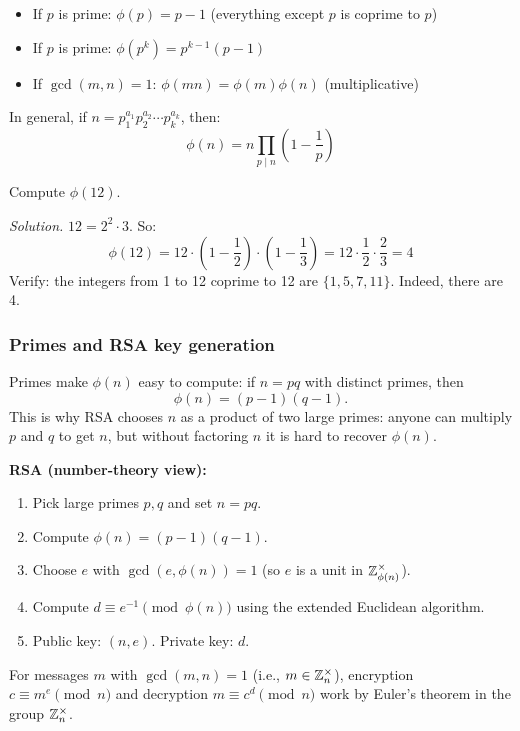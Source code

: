 \begin{theorem}
\begin{itemize}
  \item If $p$ is prime: $\phi(p) = p - 1$ (everything except $p$ is coprime to $p$)
  \item If $p$ is prime: $\phi(p^k) = p^{k-1}(p - 1)$
  \item If $\gcd(m, n) = 1$: $\phi(mn) = \phi(m)\phi(n)$ (multiplicative)
\end{itemize}
In general, if $n = p_1^{a_1} p_2^{a_2} \cdots p_k^{a_k}$, then:
\[
\phi(n) = n \prod_{p \mid n} \left(1 - \frac{1}{p}\right)
\]
\end{theorem}

\begin{example}
Compute $\phi(12)$.

\emph{Solution.} $12 = 2^2 \cdot 3$. So:
\[
\phi(12) = 12 \cdot \left(1 - \frac{1}{2}\right) \cdot \left(1 - \frac{1}{3}\right) = 12 \cdot \frac{1}{2} \cdot \frac{2}{3} = 4
\]
Verify: the integers from 1 to 12 coprime to 12 are $\{1, 5, 7, 11\}$. Indeed, there are 4.
\end{example}

\subsubsection*{Primes and RSA key generation}

Primes make $\phi(n)$ easy to compute: if $n = pq$ with distinct primes, then
\[
\phi(n) = (p-1)(q-1).
\]
This is why RSA chooses $n$ as a product of two large primes: anyone can multiply $p$ and $q$ to get $n$, but without factoring $n$ it is hard to recover $\phi(n)$.

\textbf{RSA (number-theory view):}
\begin{enumerate}
  \item Pick large primes $p, q$ and set $n = pq$.
  \item Compute $\phi(n) = (p-1)(q-1)$.
  \item Choose $e$ with $\gcd(e,\phi(n)) = 1$ (so $e$ is a unit in $\mathbb{Z}_{\phi(n)}^\times$).
  \item Compute $d \equiv e^{-1} \pmod{\phi(n)}$ using the extended Euclidean algorithm.
  \item Public key: $(n, e)$. Private key: $d$.
\end{enumerate}

For messages $m$ with $\gcd(m,n)=1$ (i.e., $m \in \mathbb{Z}_n^\times$), encryption $c \equiv m^e \pmod{n}$ and decryption $m \equiv c^d \pmod{n}$ work by Euler's theorem in the group $\mathbb{Z}_n^\times$.

